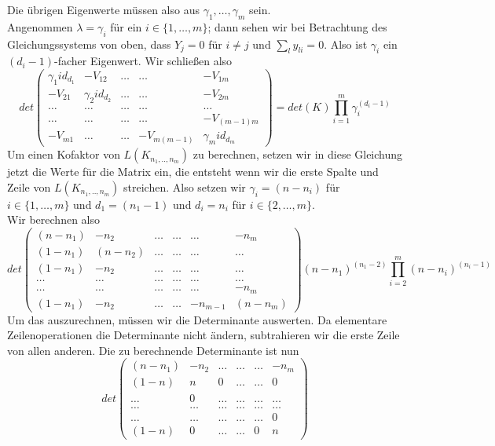 Die übrigen Eigenwerte müssen also aus $\gamma_1,\ldots,\gamma_m$ sein.\\
Angenommen $\lambda=\gamma_i$ für ein $i\in\{1,\ldots,m\}$; dann sehen wir bei Betrachtung des Gleichungssystems von oben, dass $Y_j=0$ für $i\neq j$ und $\sum_ly_{li}=0$.
Also ist $\gamma_i$ ein $(d_i-1)$-facher Eigenwert.
Wir schließen also
\begin{equation}
{det
\begin{pmatrix}
 {\gamma_1}id_{d_1}&-V_{12}&\ldots&\ldots&-V_{1m}\\
 -V_{21}&{\gamma_2}id_{d_2}&\ldots&\ldots&-V_{2m}\\
 \ldots&\ldots&\ldots&\ldots&\ldots\\
  \ldots&\ldots&\ldots&\ldots&-V_{(m-1)m}\\
 -V_{m1}&\ldots&\ldots&-V_{m(m-1)}&{\gamma_m}id_{d_m}
\end{pmatrix}
}
={det(K)\prod_{i=1}^m \gamma_i^{(d_i -1)}}
\end{equation}
Um einen Kofaktor von $L(K_{n_1,..,n_m})$ zu berechnen, setzen wir in diese Gleichung jetzt die Werte für die Matrix ein, die entsteht wenn wir die erste Spalte und Zeile von $L(K_{n_1,..,n_m})$ streichen. Also setzen wir 
$\gamma_i=(n-n_i)$ für $i\in\{1,\ldots,m\}$ und
$d_1=(n_1 -1)$ und $d_i=n_i$ für $i\in\{2,\ldots,m\}$.\\
Wir berechnen also
\begin{equation}
\label{vmp_1}
det
\begin{pmatrix}
 (n-n_1)&-n_2&\ldots&\ldots&\ldots&-n_m\\
 (1-n_1)&(n-n_2)&\ldots&\ldots&\ldots&\ldots\\
 (1-n_1)&-n_2&\ldots&\ldots&\ldots&\ldots\\
 \ldots&\ldots&\ldots&\ldots&\ldots&\ldots\\
 \ldots&\ldots&\ldots&\ldots&\ldots&-n_m\\
 (1-n_1)&-n_2&\ldots&\ldots&-n_{m-1}&(n-n_m)
\end{pmatrix}
(n-n_1)^{(n_1 -2)}\prod_{i=2}^m (n-n_i)^{(n_i -1)}
\end{equation}
Um das auszurechnen, müssen wir die Determinante auswerten. 
Da elementare Zeilenoperationen die Determinante nicht ändern, subtrahieren wir die erste Zeile von allen anderen. Die zu berechnende Determinante ist nun
\begin{equation}
det
\begin{pmatrix}
 (n-n_1)&-n_2&\ldots&\ldots&\ldots&-n_m\\
 (1-n)&n&0&\ldots&\ldots&0\\
 \ldots&0&\ldots&\ldots&\ldots&\ldots\\
 \ldots&\ldots&\ldots&\ldots&\ldots&\ldots\\
 \ldots&\ldots&\ldots&\ldots&\ldots&0\\
 (1-n)&0&\ldots&\ldots&0&n
\end{pmatrix}
\end{equation}
